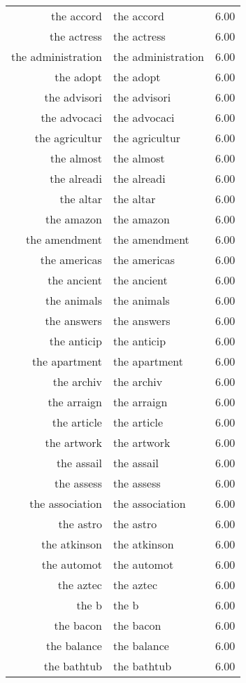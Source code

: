 \begin{table}[ht]
\begin{tabular}{rlr}
  the accord & the accord & 6.00 \\ 
  the actress & the actress & 6.00 \\ 
  the administration & the administration & 6.00 \\ 
  the adopt & the adopt & 6.00 \\ 
  the advisori & the advisori & 6.00 \\ 
  the advocaci & the advocaci & 6.00 \\ 
  the agricultur & the agricultur & 6.00 \\ 
  the almost & the almost & 6.00 \\ 
  the alreadi & the alreadi & 6.00 \\ 
  the altar & the altar & 6.00 \\ 
  the amazon & the amazon & 6.00 \\ 
  the amendment & the amendment & 6.00 \\ 
  the americas & the americas & 6.00 \\ 
  the ancient & the ancient & 6.00 \\ 
  the animals & the animals & 6.00 \\ 
  the answers & the answers & 6.00 \\ 
  the anticip & the anticip & 6.00 \\ 
  the apartment & the apartment & 6.00 \\ 
  the archiv & the archiv & 6.00 \\ 
  the arraign & the arraign & 6.00 \\ 
  the article & the article & 6.00 \\ 
  the artwork & the artwork & 6.00 \\ 
  the assail & the assail & 6.00 \\ 
  the assess & the assess & 6.00 \\ 
  the association & the association & 6.00 \\ 
  the astro & the astro & 6.00 \\ 
  the atkinson & the atkinson & 6.00 \\ 
  the automot & the automot & 6.00 \\ 
  the aztec & the aztec & 6.00 \\ 
  the b & the b & 6.00 \\ 
  the bacon & the bacon & 6.00 \\ 
  the balance & the balance & 6.00 \\ 
  the bathtub & the bathtub & 6.00 \\ 

\end{tabular}
\end{table}
